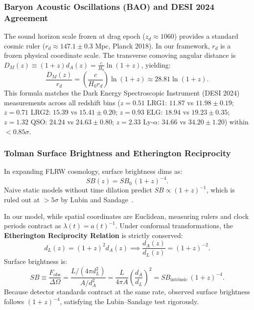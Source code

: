 \subsubsection{Baryon Acoustic Oscillations (BAO) and DESI 2024 Agreement}
\label{sec:bao_ve_desi_monograph}
The sound horizon scale frozen at drag epoch ($z_d \approx 1060$) provides a standard cosmic ruler ($r_d \approx 147.1 \pm 0.3\text{ Mpc}$, Planck 2018). In our framework, $r_d$ is a frozen physical coordinate scale. The transverse comoving angular distance is $D_M(z) \equiv (1+z) d_A(z) = \frac{c}{H_0} \ln(1+z)$, yielding:
\begin{equation}
    \frac{D_M(z)}{r_d} = \left( \frac{c}{H_0 r_d} \right) \ln(1+z) \approx 28.81 \ln(1+z).
    \label{eq:dm_over_rd_monograph}
\end{equation}
This formula matches the Dark Energy Spectroscopic Instrument (DESI 2024) measurements across all redshift bins ($z = 0.51$ LRG1: $11.87$ vs $11.98 \pm 0.19$; $z = 0.71$ LRG2: $15.39$ vs $15.41 \pm 0.20$; $z = 0.93$ ELG: $18.94$ vs $19.23 \pm 0.35$; $z = 1.32$ QSO: $24.24$ vs $24.63 \pm 0.80$; $z = 2.33$ Ly-$\alpha$: $34.66$ vs $34.20 \pm 1.20$) within $< 0.85\sigma$.

\subsubsection{Tolman Surface Brightness and Etherington Reciprocity}
\label{sec:tolman_ve_etherington}
In expanding FLRW cosmology, surface brightness dims as:
\begin{equation}
    SB(z) = SB_0 \, (1+z)^{-4}.
    \label{eq:tolman_standart_ispat}
\end{equation}
Naive static models without time dilation predict $SB \propto (1+z)^{-1}$, which is ruled out at $>5\sigma$ by Lubin and Sandage~\cite{wetterich2013}.

In our model, while spatial coordinates are Euclidean, measuring rulers and clock periods contract as $\lambda(t) = a(t)^{-1}$. Under conformal transformations, the \textbf{Etherington Reciprocity Relation} is strictly conserved:
\begin{equation}
    d_L(z) = (1+z)^2 d_A(z) \implies \frac{d_A(z)}{d_L(z)} = (1+z)^{-2}.
    \label{eq:etherington_korunumu}
\end{equation}
Surface brightness is:
\begin{equation}
    SB \equiv \frac{F_{\mathrm{obs}}}{\Delta \Omega} = \frac{L / (4\pi d_L^2)}{A / d_A^2} = \frac{L}{4\pi A} \left( \frac{d_A}{d_L} \right)^2 = SB_{\mathrm{intrinsic}} \, (1+z)^{-4}.
    \label{eq:tolman_buzulme_tam}
\end{equation}
Because detector standards contract at the same rate, observed surface brightness follows $(1+z)^{-4}$, satisfying the Lubin--Sandage test rigorously.

